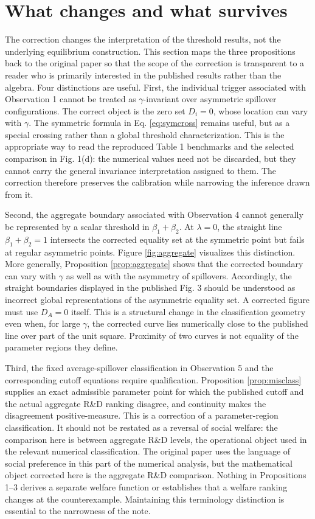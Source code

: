 \section{What changes and what survives}

The correction changes the interpretation of the threshold results, not the underlying equilibrium construction. This section maps the three propositions back to the original paper so that the scope of the correction is transparent to a reader who is primarily interested in the published results rather than the algebra. Four distinctions are useful. First, the individual trigger associated with Observation 1 cannot be treated as $\gamma$-invariant over asymmetric spillover configurations. The correct object is the zero set $D_i=0$, whose location can vary with $\gamma$. The symmetric formula in Eq. \eqref{eq:symcross} remains useful, but as a special crossing rather than a global threshold characterization. This is the appropriate way to read the reproduced Table 1 benchmarks and the selected comparison in Fig. 1(d): the numerical values need not be discarded, but they cannot carry the general invariance interpretation assigned to them. The correction therefore preserves the calibration while narrowing the inference drawn from it.

Second, the aggregate boundary associated with Observation 4 cannot generally be represented by a scalar threshold in $\beta_1+\beta_2$. At $\lambda=0$, the straight line $\beta_1+\beta_2=1$ intersects the corrected equality set at the symmetric point but fails at regular asymmetric points. Figure \ref{fig:aggregate} visualizes this distinction. More generally, Proposition \ref{prop:aggregate} shows that the corrected boundary can vary with $\gamma$ as well as with the asymmetry of spillovers. Accordingly, the straight boundaries displayed in the published Fig. 3 should be understood as incorrect global representations of the asymmetric equality set. A corrected figure must use $D_A=0$ itself. This is a structural change in the classification geometry even when, for large $\gamma$, the corrected curve lies numerically close to the published line over part of the unit square. Proximity of two curves is not equality of the parameter regions they define.

Third, the fixed average-spillover classification in Observation 5 and the corresponding cutoff equations require qualification. Proposition \ref{prop:misclass} supplies an exact admissible parameter point for which the published cutoff and the actual aggregate R\&D ranking disagree, and continuity makes the disagreement positive-measure. This is a correction of a parameter-region classification. It should not be restated as a reversal of social welfare: the comparison here is between aggregate R\&D levels, the operational object used in the relevant numerical classification. The original paper uses the language of social preference in this part of the numerical analysis, but the mathematical object corrected here is the aggregate R\&D comparison. Nothing in Propositions 1--3 derives a separate welfare function or establishes that a welfare ranking changes at the counterexample. Maintaining this terminology distinction is essential to the narrowness of the note.

